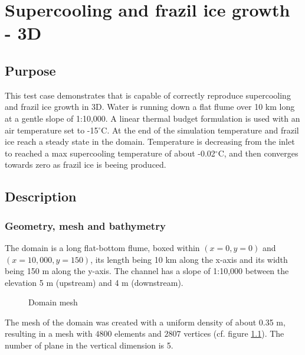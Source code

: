 \renewcommand{\labelitemi}{$\triangleright$}

\chapter{Supercooling and frazil ice growth - 3D}
%
%
\section{Purpose}
This test case demonstrates that \khione is capable of correctly reproduce
supercooling and frazil ice growth in 3D.
Water is running down a flat flume over 10 km long at a gentle slope of 1:10,000. A linear thermal budget formulation is used with an air temperature set to -15$^{\circ}$C. At the end of the simulation temperature and frazil ice reach a steady state in the domain. Temperature is decreasing from the inlet to reached a max supercooling temperature of about -0.02$^{\circ}$C, and then converges towards zero as frazil ice is beeing produced.

\section{Description}

\subsection{Geometry, mesh and bathymetry}
The domain is a long flat-bottom flume, boxed within $(x=0, y=0)$ and $(x=10,000, y=150)$, its length being 10 km along the x-axis and its width being 150 m along the y-axis. The channel has a slope of 1:10,000 between the elevation 5 m (upstream) and 4 m (downstream).

\begin{figure}[H]
    \begin{center}
    \end{center}
    \caption{Domain mesh}
    \label{fig:growth_mesh}
\end{figure}

The mesh of the domain was created with a uniform density of about 0.35 m, resulting in a mesh with $4800$ elements and $2807$ vertices (cf. figure \ref{fig:growth_mesh}). The number of plane in the vertical dimension is 5.

